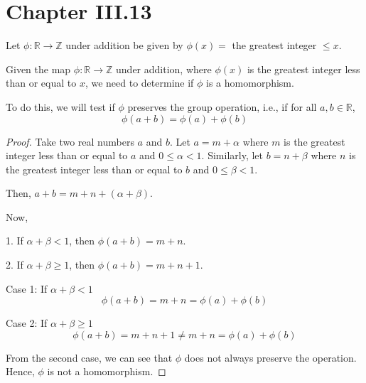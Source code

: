 \documentclass[12pt]{amsart}
\theoremstyle{definition}
\numberwithin{equation}{section}
\theoremstyle{plain}
\newcommand{\Z}{\mathbb{Z}}
\newcommand{\R}{\mathbb{R}}
\begin{document}
\section*{Chapter III.13}
\begin{exercise}{2} Let $\phi : \R \rightarrow \Z$ under addition be given by $\phi(x) =$ the greatest integer $\leq x$.

    Given the map \( \phi : \mathbb{R} \rightarrow \mathbb{Z} \) under addition, where \( \phi(x) \) is the greatest integer less than or equal to \( x \), we need to determine if \( \phi \) is a homomorphism.

To do this, we will test if \( \phi \) preserves the group operation, i.e., if for all \( a, b \in \mathbb{R} \), 
\[
\phi(a + b) = \phi(a) + \phi(b)
\]
    \begin{proof}
Take two real numbers \( a \) and \( b \). Let \( a = m + \alpha \) where \( m \) is the greatest integer less than or equal to \( a \) and \( 0 \leq \alpha < 1 \). Similarly, let \( b = n + \beta \) where \( n \) is the greatest integer less than or equal to \( b \) and \( 0 \leq \beta < 1 \).

Then, \( a+b = m+n + (\alpha+\beta) \).

Now, 

1. If \( \alpha+\beta < 1 \), then \( \phi(a+b) = m+n \).

2. If \( \alpha+\beta \geq 1 \), then \( \phi(a+b) = m+n+1 \).

Case 1: If \( \alpha+\beta < 1 \)
\[
\phi(a + b) = m+n = \phi(a) + \phi(b)
\]

Case 2: If \( \alpha+\beta \geq 1 \)
\[
\phi(a + b) = m+n+1 \neq m+n = \phi(a) + \phi(b)
\]

From the second case, we can see that \( \phi \) does not always preserve the operation. Hence, \( \phi \) is not a homomorphism.
    \end{proof}
\end{exercise}
\vspace*{20pt}
\end{document}
